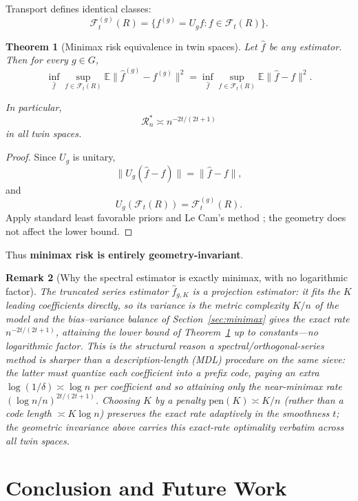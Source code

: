 \documentclass[11pt,a4paper]{article}
\newtheorem{theorem}{Theorem}[section]
\newtheorem{remark}[theorem]{Remark}
\newcommand{\E}{\mathbb{E}}
\begin{document}
Transport defines identical classes:
\[
\mathcal{F}_t^{(g)}(R) = \{f^{(g)} = U_g f : f \in \mathcal{F}_t(R)\}.
\]

\begin{theorem}[Minimax risk equivalence in twin spaces]\label{thm:minimax}
Let $\hat{f}$ be any estimator. Then for every $g \in G$,
\[
\inf_{\hat{f}} \sup_{f \in \mathcal{F}_t(R)} \E \|\hat{f}^{(g)} - f^{(g)}\|^2 = \inf_{\hat{f}} \sup_{f \in \mathcal{F}_t(R)} \E \|\hat{f} - f\|^2.
\]

In particular,
\[
\mathcal{R}_n^* \asymp n^{-2t/(2t+1)}
\]
in all twin spaces.
\end{theorem}

\begin{proof}
Since $U_g$ is unitary,
\[
\|U_g(\hat{f} - f)\| = \|\hat{f} - f\|,
\]
and
\[
U_g(\mathcal{F}_t(R)) = \mathcal{F}_t^{(g)}(R).
\]
Apply standard least favorable priors and Le Cam's method \citep{LeCam1986,Yu1997}; the geometry does not affect the lower bound.
\end{proof}

Thus \textbf{minimax risk is entirely geometry-invariant}.

\begin{remark}[Why the spectral estimator is exactly minimax, with no logarithmic factor]
The truncated series estimator $\hat f_{g,K}$ is a \emph{projection} estimator: it
fits the $K$ leading coefficients directly, so its variance is the metric
complexity $K/n$ of the model and the bias--variance balance of
Section~\ref{sec:minimax} gives the \emph{exact} rate $n^{-2t/(2t+1)}$, attaining
the lower bound of Theorem~\ref{thm:minimax} up to constants---no logarithmic
factor. This is the structural reason a spectral/orthogonal-series method is
sharper than a description-length (MDL) procedure on the same sieve: the latter
must quantize each coefficient into a prefix code, paying an extra
$\log(1/\delta)\asymp\log n$ per coefficient and so attaining only the
near-minimax rate $(\log n/n)^{2t/(2t+1)}$. Choosing $K$ by a penalty
$\mathrm{pen}(K)\asymp K/n$ (rather than a code length $\asymp K\log n$) preserves
the exact rate \emph{adaptively} in the smoothness $t$; the geometric invariance
above carries this exact-rate optimality verbatim across all twin spaces.
\end{remark}

\section{Conclusion and Future Work}\label{sec:conclusion}
\end{document}
